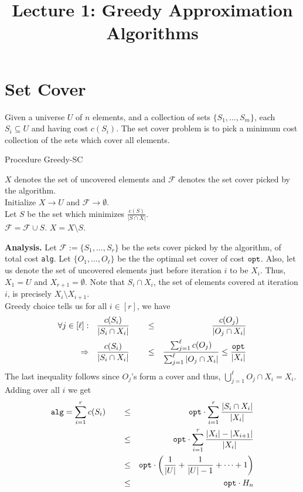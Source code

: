\documentclass[11pt]{article}
\def\script#1{\mathcal{#1}}
\def\opt{{\tt opt}}
\def\alg{{\tt alg}}
\newlength{\algobox}
\begin{document}
\title{Lecture 1: Greedy Approximation Algorithms}
\author{}
\date{}
\maketitle
\section{Set Cover}
Given a universe $U$ of $n$ elements, and a collection of sets $\{S_1,\ldots,S_m\}$, each $S_i\subseteq U$ and having cost
$c(S_i)$. The set cover problem is to pick a minimum cost collection of the sets which cover all elements.

\vspace{2ex}\noindent
\begin{boxedminipage}{\algobox}
Procedure {\sc Greedy-SC}
\begin{algorithmic}[1]
  \STATE $X$ denotes the set of uncovered elements and $\script{F}$ denotes the set cover picked by the algorithm. \\
  \STATE Initialize $X \to U$ and $\script{F} \to \emptyset$. \\
  	\STATE Let $S$ be the set which minimizes $\frac{c(S)}{|S\cap X|}$.\\
	\STATE $\script{F} = \script{F} \cup S$. $X = X\setminus S$.
  \ENDWHILE
\end{algorithmic}
\end{boxedminipage}
\vspace{1ex}

\noindent
{\bf Analysis.} Let $\script{F} := \{S_1,\ldots,S_r\}$ be the sets cover picked by the algorithm, of total cost \alg.
Let $\{O_1,\ldots,O_\ell\}$ be the the optimal set cover of cost $\opt$. Also, let us denote the set of uncovered 
elements just before iteration $i$ to be $X_i$. Thus, $X_1 = U$ and $X_{r+1} = \emptyset$.
Note that $S_i \cap X_i$, the set of elements covered at iteration $i$, is precisely $X_i \setminus X_{i+1}$. \\

\noindent
Greedy choice tells us for all $i\in [r]$, we have
\begin{align}
\forall j \in [\ell]: ~~ \frac{c(S_i)}{|S_i\cap X_i|}  \qquad & \le & ~ \frac{c(O_j)}{|O_j\cap X_i|} \\
\Rightarrow  ~~ \frac{c(S_i)}{|S_i\cap X_i|}  \qquad & \le & \frac{\sum_{j=1}^\ell c(O_j)}{\sum_{j=1}^\ell |O_j\cap X_i|} \le \frac{\opt}{|X_i|} \label{eq:weakness}
\end{align}
The last inequality follows since $O_j$'s form a cover and thus, $\bigcup_{j=1}^\ell O_j\cap X_i = X_i$.
Adding over all $i$ we get
\begin{align*}
\alg = \sum_{i=1}^r c(S_i) 	\qquad & \le & \opt \cdot \sum_{i=1}^r \frac{|S_i\cap X_i|}{|X_i|} \\
					\qquad & \le & \opt \cdot \sum_{i=1}^r \frac{|X_i| - |X_{i+1}|}{|X_i|} \\
					\qquad & \le & \opt \cdot \left(\frac{1}{|U|} + \frac{1}{|U|-1} + \cdots + 1\right) \\							\qquad & \le & \opt \cdot H_n
\end{align*}
\end{document}
